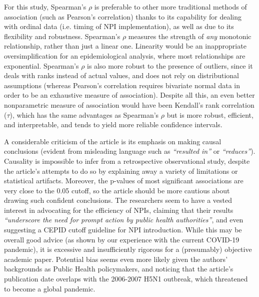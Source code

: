 \documentclass{article}
\begin{document}
\begin{multicols}{2}
For this study, Spearman's $\rho$ is preferable to other more traditional methods of association (such as Pearson's correlation) thanks to its capability for dealing with ordinal data (i.e. timing of NPI implementation), as well as due to its flexibility and robustness. Spearman's $\rho$ measures the strength of \textit{any} monotonic relationship, rather than just a linear one. Linearity would be an inappropriate oversimplification for an epidemiological analysis, where most relationships are exponential. Spearman's $\rho$ is also more robust to the presence of outliers, since it deals with ranks instead of actual values, and does not rely on distributional assumptions (whereas Pearson's correlation requires bivariate normal data in order to be an exhaustive measure of association). Despite all this, an even better nonparametric measure of association would have been Kendall's rank correlation ($\tau$), which has the same advantages as Spearman's $\rho$ but is more robust, efficient, and interpretable, and tends to yield more reliable confidence intervals.

A considerable criticism of the article is its emphasis on making causal conclusions (evident from misleading language such as \textit{``resulted in''} or \textit{``reduces''}). Causality is impossible to infer from a retrospective observational study, despite the article's attempts to do so by explaining away a variety of limitations or statistical artifacts. Moreover, the p-values of most significant associations are very close to the 0.05 cutoff, so the article should be more cautious about drawing such confident conclusions. The researchers seem to have a vested interest in advocating for the efficiency of NPIs, claiming that their results \textit{``underscore the need for prompt action by public health authorities''}, and even suggesting a CEPID cutoff guideline for NPI introduction. While this may be overall good advice (as shown by our experience with the current COVID-19 pandemic), it is excessive and insufficiently rigorous for a (presumably) objective academic paper. Potential bias seems even more likely given the authors' backgrounds as Public Health policymakers, and noticing that the article's publication date overlaps with the 2006-2007 H5N1 outbreak, which threatened to become a global pandemic.

\end{multicols}


\end{document}

